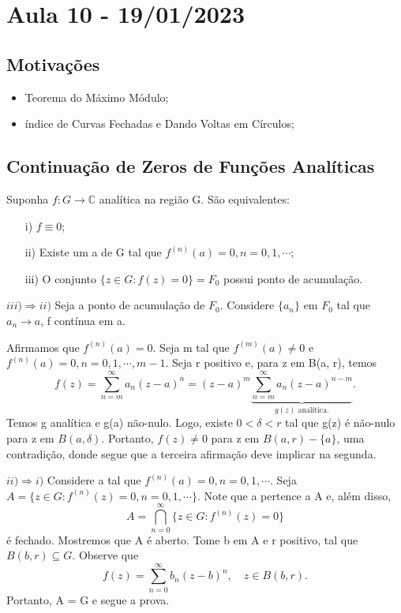 \documentclass[ComplexAnalysis/complex.tex]{subfiles}
\begin{document}
\section{Aula 10 - 19/01/2023}
\subsection{Motivações}
\begin{itemize}
	\item Teorema do Máximo Módulo;
	\item índice de Curvas Fechadas e Dando Voltas em Círculos;
\end{itemize}

\subsection{Continuação de Zeros de Funções Analíticas}
\begin{prop*}
	Suponha $f:G\rightarrow \mathbb{C}$ analítica na região G. São equivalentes:
	\begin{itemize}
		\item[i)] $f\equiv0$;
		\item[ii)] Existe um a de G tal que $f^{(n)}(a) = 0, n = 0, 1, \cdots;$
		\item[iii)] O conjunto $\{z\in{G}: f(z) = 0\} = F_{0} $ possui ponto de acumulação.
	\end{itemize}
\end{prop*}
\begin{proof*}
	$iii)\Rightarrow ii)$ Seja a ponto de acumulação de $F_{0}$. Considere $\{a_{n}\} $ em $F_{0}$ tal que $a_{n}\to{a}$, f contínua em a.

	Afirmamos que $f^{(n)}(a) = 0.$  Seja m tal que $f^{(m)}(a)\neq 0 $ e $f^{(n)}(a) = 0, n = 0, 1, \cdots, m-1 $. Seja r positivo
	e, para z em B(a, r), temos
	$$
		f(z) = \sum\limits_{n=m}^{\infty}a_{n}(z-a)^{n} = (z-a)^{m}\underbrace{\sum\limits_{n=m}^{\infty}a_{n}(z-a)^{n-m}}_{g(z)\text{ analítica.}}.
	$$
	Temos g analítica e g(a) não-nulo. Logo, existe $0 < \delta < r$ tal que g(z) é não-nulo para z em $B(a, \delta)$. Portanto,
	$f(z)\neq0$ para z em $B(a, r) - \{a\} $, uma contradição, donde segue que a terceira afirmação deve implicar na segunda. \qedsymbol

	$ii)\Rightarrow i)$ Considere a tal que $f^{(n)}(a) = 0, n = 0, 1, \cdots$. Seja $A=\{z\in{G}: f^{(n)}(z) = 0, n=0, 1, \cdots\} $. Note que
	a pertence a A e, além disso,
	$$
		A = \bigcap_{n=0}^{\infty}\{z\in{G}: f^{(n)}(z) = 0\}
	$$
	é fechado. Mostremos que A é aberto. Tome b em A e r positivo, tal que $B(b, r)\subseteq{G}.$ Observe que
	$$
		f(z) = \sum\limits_{n=0}^{\infty}b_{n}(z-b)^{n}, \quad z\in{B(b, r)}.
	$$
	Portanto, A = G e segue a prova. \qedsymbol
\end{proof*}
\end{document}
